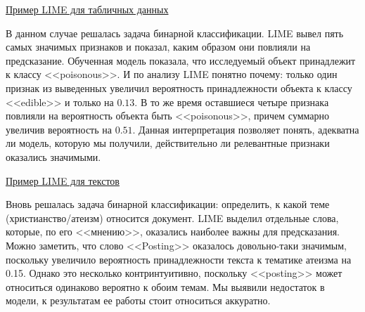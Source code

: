 \underline{Пример LIME для табличных данных} \cite{limegit}
\vspace{-3mm}

\begin{figure}[h]
\end{figure}

В данном случае решалась задача бинарной классификации. LIME вывел пять самых значимых признаков и показал, каким образом они повлияли на предсказание. Обученная модель показала, что исследуемый объект принадлежит к классу <<poisonous>>. И по анализу LIME понятно почему: только один признак из выведенных увеличил вероятность принадлежности объекта к классу <<edible>> и только на $0.13$. В то же время оставшиеся четыре признака повлияли на вероятность объекта быть <<poisonous>>, причем суммарно увеличив вероятность на $0.51$. Данная интерпретация позволяет понять, адекватна ли модель, которую мы получили, действительно ли релевантные признаки оказались значимыми.

\underline{Пример LIME для текстов} \cite{limegit}
\vspace{-3mm}

\begin{figure}[h]
\end{figure}

Вновь решалась задача бинарной классификации: определить, к какой теме (христианство/атеизм) относится документ. LIME выделил отдельные слова, которые, по его <<мнению>>, оказались наиболее важны для предсказания. Можно заметить, что слово <<Posting>> оказалось довольно-таки значимым, поскольку увеличило вероятность принадлежности текста к тематике атеизма на 0.15. Однако это несколько контринтуитивно, поскольку <<posting>> может относиться одинаково вероятно к обоим темам. Мы выявили недостаток в модели, к результатам ее работы стоит относиться аккуратно.

